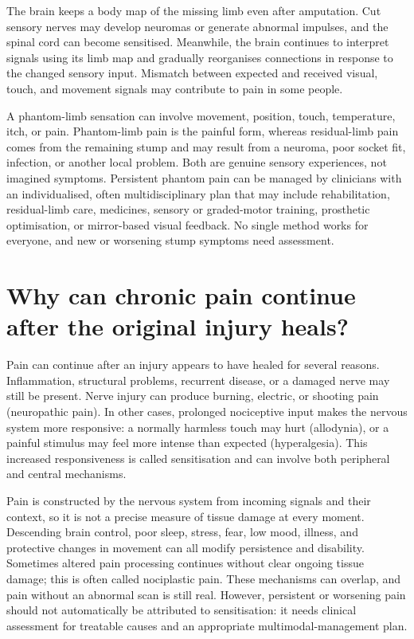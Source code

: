 \documentclass[11pt,oneside]{report}
\begin{document}
The brain keeps a body map of the missing limb even after amputation. Cut
sensory nerves may develop neuromas or generate abnormal impulses, and the
spinal cord can become sensitised. Meanwhile, the brain continues to interpret
signals using its limb map and gradually reorganises connections in response to
the changed sensory input. Mismatch between expected and received visual,
touch, and movement signals may contribute to pain in some people.

A phantom-limb sensation can involve movement, position, touch, temperature,
itch, or pain. Phantom-limb pain is the painful form, whereas residual-limb
pain comes from the remaining stump and may result from a neuroma, poor socket
fit, infection, or another local problem. Both are genuine sensory experiences,
not imagined symptoms. Persistent phantom pain can be managed by clinicians
with an individualised, often multidisciplinary plan that may include
rehabilitation, residual-limb care, medicines, sensory or graded-motor
training, prosthetic optimisation, or mirror-based visual feedback. No single
method works for everyone, and new or worsening stump symptoms need assessment.

\section{Why can chronic pain continue after the original injury heals?}

Pain can continue after an injury appears to have healed for several reasons.
Inflammation, structural problems, recurrent disease, or a damaged nerve may
still be present. Nerve injury can produce burning, electric, or shooting pain
(neuropathic pain). In other cases, prolonged nociceptive input makes the
nervous system more responsive: a normally harmless touch may hurt (allodynia),
or a painful stimulus may feel more intense than expected (hyperalgesia). This
increased responsiveness is called sensitisation and can involve both
peripheral and central mechanisms.

Pain is constructed by the nervous system from incoming signals and their
context, so it is not a precise measure of tissue damage at every moment.
Descending brain control, poor sleep, stress, fear, low mood, illness, and
protective changes in movement can all modify persistence and disability.
Sometimes altered pain processing continues without clear ongoing tissue
damage; this is often called nociplastic pain. These mechanisms can overlap,
and pain without an abnormal scan is still real. However, persistent or
worsening pain should not automatically be attributed to sensitisation: it
needs clinical assessment for treatable causes and an appropriate
multimodal-management plan.
\end{document}
